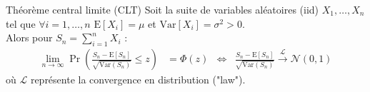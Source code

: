 \documentclass[10pt, french]{article}
\begin{document}
\begin{multicols*}{2}
\begin{algo}{Théorème central limite (CLT)}
Soit la suite de variables aléatoires (iid) $X_{1}, \dots, X_{n}$ tel que $\forall i = 1, \dots, n$ $\text{E}[X_{i}] = \mu$ et $\text{Var}[X_{i}] = \sigma^{2} > 0$.\\
Alors pour $S_{n} = \sum_{i = 1}^{n} X_{i}$ :
\begin{align*} 
	\underset{n \rightarrow \infty}{\lim} \Pr\left( \frac{S_{n} - \text{E}[S_{n}]}{\sqrt{\text{Var}(S_{n})}} \le z \right) 
	&=	\Phi(z)
	&\Leftrightarrow	&
	\frac{S_{n} - \text{E}[S_{n}]}{\sqrt{\text{Var}(S_{n})}} \overset{\mathcal{L}}{\longrightarrow} \mathcal{N}(0, 1)
\end{align*}
où $\mathcal{L}$ représente la convergence en distribution ("law").
\end{algo}

\end{multicols*}
\end{document}
